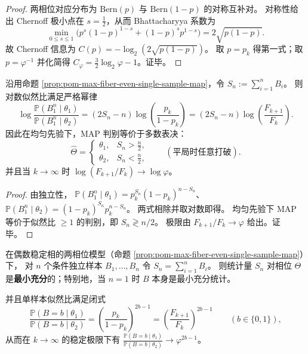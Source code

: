\begin{proof}
两相位对应分布为 \(\mathrm{Bern}(p)\) 与 \(\mathrm{Bern}(1-p)\) 的对称互补对。
对称性给出 Chernoff 极小点在 \(s=\tfrac12\)，从而 Bhattacharyya 系数为
\[
\min_{0\le s\le 1}\Big(p^s(1-p)^{1-s}+(1-p)^s p^{1-s}\Big)=2\sqrt{p(1-p)}.
\]
故 Chernoff 信息为 \(C(p)=-\log_2(2\sqrt{p(1-p)})\)。
取 \(p=p_k\) 得第一式；取 \(p=\varphi^{-1}\) 并化简得 \(C_\varphi=\frac32\log_2\varphi-1\)。证毕。
\end{proof}

\begin{proposition}\label{prop:pom-max-fiber-even-majority-vote}
沿用命题 \ref{prop:pom-max-fiber-even-single-sample-map}，令
\(
S_n:=\sum_{i=1}^{n}B_i
\)。
则对数似然比满足严格幂律
\[
\log\frac{\mathbb{P}(B_1^n\mid\theta_1)}{\mathbb{P}(B_1^n\mid\theta_2)}
=(2S_n-n)\log\!\left(\frac{p_k}{1-p_k}\right)
=(2S_n-n)\log\!\left(\frac{F_{k+1}}{F_k}\right).
\]
因此在均匀先验下，MAP 判别等价于多数表决：
\[
\widehat\Theta=
\begin{cases}
\theta_1,& S_n>\frac n2,\\
\theta_2,& S_n<\frac n2,
\end{cases}
\qquad(\text{平局时任意打破}).
\]
并且当 \(k\to\infty\) 时 \(\log(F_{k+1}/F_k)\to \log\varphi\)。
\end{proposition}

\begin{proof}
由独立性，
\(
\mathbb{P}(B_1^n\mid\theta_1)=p_k^{S_n}(1-p_k)^{n-S_n}
\)、
\(
\mathbb{P}(B_1^n\mid\theta_2)=(1-p_k)^{S_n}p_k^{n-S_n}
\)。
两式相除并取对数即得。
均匀先验下 MAP 等价于似然比 \(\ge 1\) 的判别，即 \(S_n\gtrless n/2\)。
极限由 \(F_{k+1}/F_k\to \varphi\) 给出。证毕。
\end{proof}

\begin{proposition}\label{prop:pom-max-fiber-hidden-bit-minimal-sufficient}
在偶数稳定相的两相位模型（命题 \ref{prop:pom-max-fiber-even-single-sample-map}）下，
对 \(n\) 个条件独立样本 \(B_1,\dots,B_n\) 令 \(S_n=\sum_{i=1}^n B_i\)。
则统计量 \(S_n\) 对相位 \(\Theta\) 是\textbf{最小充分}的；特别地，当 \(n=1\) 时 \(B\) 本身是最小充分统计。
\par
并且单样本似然比满足闭式
\[
\boxed{\;
\frac{\mathbb{P}(B=b\mid\theta_1)}{\mathbb{P}(B=b\mid\theta_2)}
=\left(\frac{p_k}{1-p_k}\right)^{2b-1}
=\left(\frac{F_{k+1}}{F_k}\right)^{2b-1}\qquad(b\in\{0,1\}),\;}
\]
从而在 \(k\to\infty\) 的稳定极限下有
\(
\frac{\mathbb{P}(B=b\mid\theta_1)}{\mathbb{P}(B=b\mid\theta_2)}\to \varphi^{2b-1}
\)。
\end{proposition}

